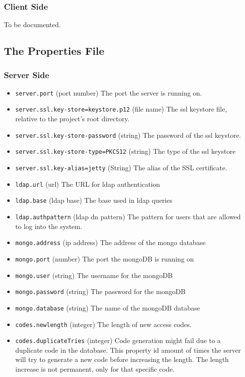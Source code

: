 \subsubsection{Client Side}
To be documented.

\subsection{The Properties File}
\subsubsection{Server Side}
\begin{itemize}
\item \verb!server.port! (port number) The port the server is running on.
\item \verb!server.ssl.key-store=keystore.p12! (file name) The ssl keystore file, relative to the project's root directory.
\item \verb!server.ssl.key-store-password! (string) The password of the ssl keystore.
\item \verb!server.ssl.key-store-type=PKCS12! (string) The type of the ssl keystore 
\item \verb!server.ssl.key-alias=jetty! (String) The alias of the SSL certificate.

\item \verb!ldap.url! (url) The URL for ldap authentication
\item \verb!ldap.base! (ldap base) The base used in ldap queries
\item \verb!ldap.authpattern! (ldap dn pattern) The pattern for users that are allowed to log into the system. 
\item \verb!mongo.address! (ip address) The address of the mongo database
\item \verb!mongo.port! (number) The port the mongoDB is running on
\item \verb!mongo.user! (string) The username for the mongoDB
\item \verb!mongo.password! (string) The password for the mongoDB
\item \verb!mongo.database! (string) The name of the mongoDB database

\item \verb!codes.newlength! (integer) The length of new access codes.
\item \verb!codes.duplicateTries! (integer) Code generation might fail due to a duplicate code in the database. This property id amount of times the server will try to generate a new code before increasing the length. The length increase is not permanent, only for that specific code.


\end{itemize}
